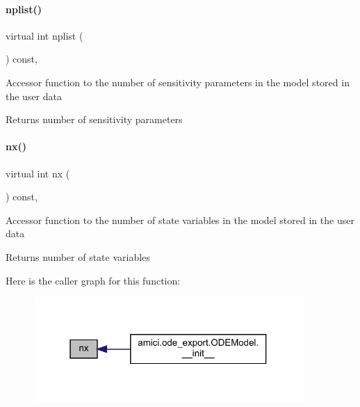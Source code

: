 \paragraph{\texorpdfstring{nplist()}{nplist()}}
{\footnotesize\ttfamily virtual int nplist (\begin{DoxyParamCaption}{ }\end{DoxyParamCaption}) const\hspace{0.3cm}{\ttfamily [protected]}, {}}

Accessor function to the number of sensitivity parameters in the model stored in the user data

\begin{DoxyReturn}{Returns}
number of sensitivity parameters 
\end{DoxyReturn}
\mbox{\label{classamici_1_1_solver_a86a18c4e461de76881b6af72e4feb8d9}} 
\paragraph{\texorpdfstring{nx()}{nx()}}
{\footnotesize\ttfamily virtual int nx (\begin{DoxyParamCaption}{ }\end{DoxyParamCaption}) const\hspace{0.3cm}{\ttfamily [protected]}, {}}

Accessor function to the number of state variables in the model stored in the user data

\begin{DoxyReturn}{Returns}
number of state variables 
\end{DoxyReturn}
Here is the caller graph for this function\+:
\nopagebreak
\begin{figure}[H]
\begin{center}
\leavevmode
\includegraphics[width=292pt]{classamici_1_1_solver_a86a18c4e461de76881b6af72e4feb8d9_icgraph}
\end{center}
\end{figure}
\mbox{\label{classamici_1_1_solver_a3ea583e4e53b188c54f426f1bc652a0f}} 
